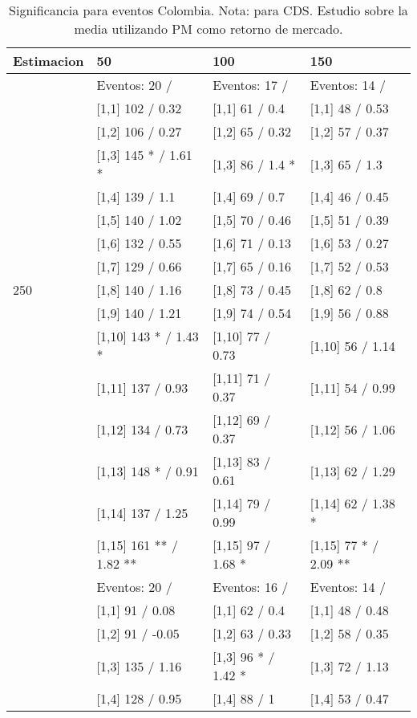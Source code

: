 \begin{table}

\caption{Significancia para eventos Colombia. Nota: para CDS. Estudio sobre la media utilizando PM como retorno de mercado.}
\centering
\begin{tabular}[t]{llll}
\toprule
Estimacion & 50 & 100 & 150\\
\midrule
 & Eventos:  20 / & Eventos:  17 / & Eventos:  14 /\\
 & {}[1,1] 102  / 0.32 & {}[1,1] 61  / 0.4 & {}[1,1] 48  / 0.53\\
 & {}[1,2] 106  / 0.27 & {}[1,2] 65  / 0.32 & {}[1,2] 57  / 0.37\\
 & {}[1,3] 145 * / 1.61 * & {}[1,3] 86  / 1.4 * & {}[1,3] 65  / 1.3\\
 & {}[1,4] 139  / 1.1 & {}[1,4] 69  / 0.7 & {}[1,4] 46  / 0.45\\
\addlinespace
 & {}[1,5] 140  / 1.02 & {}[1,5] 70  / 0.46 & {}[1,5] 51  / 0.39\\
 & {}[1,6] 132  / 0.55 & {}[1,6] 71  / 0.13 & {}[1,6] 53  / 0.27\\
 & {}[1,7] 129  / 0.66 & {}[1,7] 65  / 0.16 & {}[1,7] 52  / 0.53\\
250 & {}[1,8] 140  / 1.16 & {}[1,8] 73  / 0.45 & {}[1,8] 62  / 0.8\\
 & {}[1,9] 140  / 1.21 & {}[1,9] 74  / 0.54 & {}[1,9] 56  / 0.88\\
\addlinespace
 & {}[1,10] 143 * / 1.43 * & {}[1,10] 77  / 0.73 & {}[1,10] 56  / 1.14\\
 & {}[1,11] 137  / 0.93 & {}[1,11] 71  / 0.37 & {}[1,11] 54  / 0.99\\
 & {}[1,12] 134  / 0.73 & {}[1,12] 69  / 0.37 & {}[1,12] 56  / 1.06\\
 & {}[1,13] 148 * / 0.91 & {}[1,13] 83  / 0.61 & {}[1,13] 62  / 1.29\\
 & {}[1,14] 137  / 1.25 & {}[1,14] 79  / 0.99 & {}[1,14] 62  / 1.38 *\\
\addlinespace
 & {}[1,15] 161 ** / 1.82 ** & {}[1,15] 97  / 1.68 * & {}[1,15] 77 * / 2.09 **\\
 & Eventos:  20 / & Eventos:  16 / & Eventos:  14 /\\
 & {}[1,1] 91  / 0.08 & {}[1,1] 62  / 0.4 & {}[1,1] 48  / 0.48\\
 & {}[1,2] 91  / -0.05 & {}[1,2] 63  / 0.33 & {}[1,2] 58  / 0.35\\
 & {}[1,3] 135  / 1.16 & {}[1,3] 96 * / 1.42 * & {}[1,3] 72  / 1.13\\
\addlinespace
 & {}[1,4] 128  / 0.95 & {}[1,4] 88  / 1 & {}[1,4] 53  / 0.47\\

\end{tabular}
\end{table}
